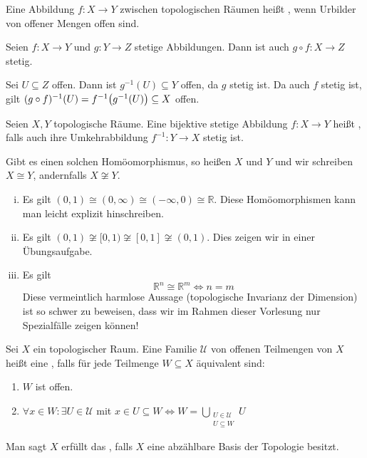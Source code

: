 \begin{definition}[{name=[Stetigkeit in topologischen Räumen]}]
	Eine Abbildung $f \colon X \to Y$ zwischen topologischen Räumen heißt , wenn Urbilder von offener Mengen offen sind.
\end{definition}

\begin{lemma}[{name=[Verknüpfung stetiger Abbildungen]}]
	Seien $f \colon X \to Y$ und $g \colon Y \to Z$ stetige Abbildungen.
	Dann ist auch $g \circ f \colon X \to Z$ stetig.
\end{lemma}
\begin{beweis}
	Sei $U \subseteq Z$ offen.
	Dann ist $g ^{-1}(U) \subseteq Y$ offen, da $g$ stetig ist.
	Da auch $f$ stetig ist, gilt
	$\enbrace{g \circ f } ^{-1} (U) = f ^{-1} \enbrace[\big]{g^{-1} (U)} \subseteq X$ offen.
\end{beweis}

\begin{definition}[{name=[Homöomorphismus]}]
	Seien $X,Y$ topologische Räume.
	Eine bijektive stetige Abbildung $f \colon X \to Y$ heißt , falls auch ihre Umkehrabbildung  $f^{-1} \colon Y \to X$
	stetig ist.

	Gibt es einen solchen Homöomorphismus, so heißen $X$ und $Y$  und wir schreiben $X \cong Y$, andernfalls $X \not\cong Y$.
\end{definition}

\begin{beispiel}[{name=[Homöomorphismen]}]
	\begin{enumerate}[(i)]
		\item Es gilt $(0,1) \cong (0,\infty) \cong (-\infty,0) \cong \mathbb{R}$.
		Diese Homöomorphismen kann man leicht explizit hinschreiben.
		\item Es gilt $(0,1)\not\cong [0,1) \not\cong [0,1] \not\cong (0,1)$.
		Dies zeigen wir in einer Übungsaufgabe.
		\item Es gilt
		\[
			\mathbb{R}^n \cong \mathbb{R}^m \iff n=m
		\]
		Diese vermeintlich harmlose Aussage (topologische Invarianz der Dimension) ist so schwer zu beweisen, dass wir im Rahmen dieser Vorlesung nur Spezialfälle zeigen können!
	\end{enumerate}
\end{beispiel}

\begin{definition}[{name=[Basis einer Topologie]},label=def:basis-zweitabz]
	Sei $X$ ein topologischer Raum.
	Eine Familie $\mathcal{U}$ von offenen Teilmengen von $X$ heißt eine , falls für jede Teilmenge $W \subseteq X$
	äquivalent sind:
	\begin{enumerate}[(1)]
		\item $W$ ist offen.
		\item $\forall x \in W  : \exists U \in \mathcal{U}$ mit $x \in U \subseteq  W \iff W = \bigcup_{\substack{U \in \mathcal{U} \\ U \subseteq W}} U$
	\end{enumerate}
	Man sagt $X$ erfüllt das , falls $X$ eine abzählbare Basis der Topologie besitzt.
\end{definition}


